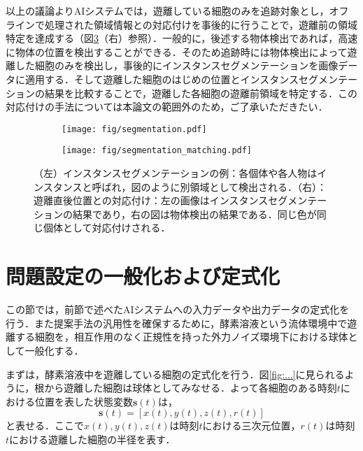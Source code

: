    以上の議論よりAIシステムでは，遊離している細胞のみを追跡対象とし，オフラインで処理された領域情報との対応付けを事後的に行うことで，遊離前の領域特定を達成する（図\ref{fig:instance_segmentation_and_matching}（右）参照）．一般的に，後述する物体検出であれば，高速に物体の位置を検出することができる．そのため追跡時には物体検出によって遊離した細胞のみを検出し，事後的にインスタンスセグメンテーションを画像データに適用する．そして遊離した細胞のはじめの位置とインスタンスセグメンテーションの結果を比較することで，遊離した各細胞の遊離前領域を特定する．この対応付けの手法については本論文の範囲外のため，ご了承いただきたい．

    \begin{figure}[t]
        \centering
        \begin{subfigure}[b]{.4\linewidth}
            \centering
            \texttt{[image: fig/segmentation.pdf]}
            \label{fig:instance_segmentation}
        \end{subfigure}
        \hfill
        \begin{subfigure}[b]{.4\linewidth}
            \centering
            \texttt{[image: fig/segmentation\_matching.pdf]}
            \label{fig:segmentation_matching}
        \end{subfigure}
        \caption[インスタンスセグメンテーションの例と遊離直後位置との対応付け]{（左）インスタンスセグメンテーションの例：各個体や各人物はインスタンスと呼ばれ，図のように別領域として検出される．（右）：遊離直後位置との対応付け：左の画像はインスタンスセグメンテーションの結果であり，右の図は物体検出の結果である．同じ色が同じ個体として対応付けされる．}
        \label{fig:instance_segmentation_and_matching}
    \end{figure}

\section{問題設定の一般化および定式化}
\label{sec:setting}

この節では，前節で述べたAIシステムへの入力データや出力データの定式化を行う．また提案手法の汎用性を確保するために，酵素溶液という流体環境中で遊離する細胞を，相互作用のなく正規性を持った外力ノイズ環境下における球体として一般化する．

まずは，酵素溶液中を遊離している細胞の定式化を行う．図\ref{fig:...}に見られるように，根から遊離した細胞は球体としてみなせる．よって各細胞のある時刻$t$における位置を表した状態変数$\bm{s}(t)$は，
\begin{equation}
    \label{eq:continous_state_vecotr}
    \bm{s}(t) = \left[x(t), y(t), z(t), r(t)\right]
\end{equation}
と表せる．ここで$x(t),y(t),z(t)$は時刻$t$における三次元位置，$r(t)$は時刻$t$における遊離した細胞の半径を表す．

